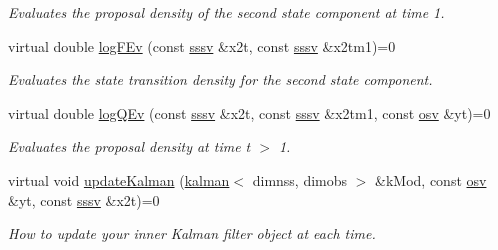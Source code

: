 \begin{DoxyCompactItemize}
\begin{DoxyCompactList}\small\item\em Evaluates the proposal density of the second state component at time 1. \end{DoxyCompactList}\item 
virtual double \hyperlink{classrbpf__kalman_aecbc33a662f7d543cc5005146aef4971}{log\+F\+Ev} (const \hyperlink{classrbpf__kalman_a17f2cf0b4ee4a1c8f2bfdb5356c53844}{sssv} \&x2t, const \hyperlink{classrbpf__kalman_a17f2cf0b4ee4a1c8f2bfdb5356c53844}{sssv} \&x2tm1)=0
\begin{DoxyCompactList}\small\item\em Evaluates the state transition density for the second state component. \end{DoxyCompactList}\item 
virtual double \hyperlink{classrbpf__kalman_a762c5723967b553b4c2b89326462e72b}{log\+Q\+Ev} (const \hyperlink{classrbpf__kalman_a17f2cf0b4ee4a1c8f2bfdb5356c53844}{sssv} \&x2t, const \hyperlink{classrbpf__kalman_a17f2cf0b4ee4a1c8f2bfdb5356c53844}{sssv} \&x2tm1, const \hyperlink{classrbpf__kalman_a4fdeb1b9b626811569b6ac4327c6cbb2}{osv} \&yt)=0
\begin{DoxyCompactList}\small\item\em Evaluates the proposal density at time t $>$ 1. \end{DoxyCompactList}\item 
virtual void \hyperlink{classrbpf__kalman_a61f63f52c94b8a57f5963981f1ca120b}{update\+Kalman} (\hyperlink{classkalman}{kalman}$<$ dimnss, dimobs $>$ \&k\+Mod, const \hyperlink{classrbpf__kalman_a4fdeb1b9b626811569b6ac4327c6cbb2}{osv} \&yt, const \hyperlink{classrbpf__kalman_a17f2cf0b4ee4a1c8f2bfdb5356c53844}{sssv} \&x2t)=0
\begin{DoxyCompactList}\small\item\em How to update your inner Kalman filter object at each time. \end{DoxyCompactList}\end{DoxyCompactItemize}
